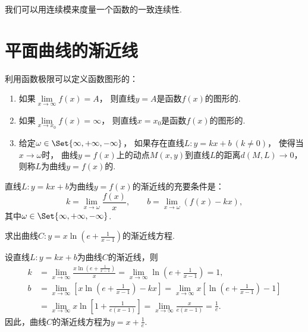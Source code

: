 我们可以用连续模来度量一个函数的一致连续性.

\section{平面曲线的渐近线}
\begin{definition}
利用函数极限可以定义函数图形的：
\begin{enumerate}
	\item 如果\(\lim\limits_{x \to \infty}f(x) = A\)，
	则直线\(y = A\)是函数\(f(x)\)的图形的.
	\item 如果\(\lim\limits_{x \to x_0}f(x) = \infty\)，
	则直线\(x = x_0\)是函数\(f(x)\)的图形的.
	\item 给定\(\omega\in\Set{\infty,+\infty,-\infty}\)，
	如果存在直线\(L: y = kx+b\ (k \neq 0)\)，
	使得当\(x\to\omega\)时，
	曲线\(y = f(x)\)上的动点\(M(x,y)\)到直线\(L\)的距离\(d(M,L)\to0\)，
	则称\(L\)为曲线\(y = f(x)\)的.
\end{enumerate}
\end{definition}

\begin{theorem}
直线\(L: y = kx+b\)为曲线\(y = f(x)\)的渐近线的充要条件是：\[
	k = \lim\limits_{x\to\omega} \frac{f(x)}{x},
	\qquad
	b = \lim\limits_{x\to\omega} (f(x) - kx),
\]
其中\(\omega\in\Set{\infty,+\infty,-\infty}\).
\end{theorem}

\begin{example}
求出曲线\(C: y = x \ln\left(e+\frac{1}{x-1}\right)\)的渐近线方程.
\begin{solution}
设直线\(L: y = kx+b\)为曲线\(C\)的渐近线，则\begin{align*}
	k &= \lim\limits_{x\to\infty} \frac{x \ln\left(e+\frac{1}{x-1}\right)}{x}
	= \lim\limits_{x\to\infty} \ln\left(e+\frac{1}{x-1}\right)
	= 1, \\
	b &= \lim\limits_{x\to\infty} \left[ x \ln\left(e+\frac{1}{x-1}\right) - kx \right]
	= \lim\limits_{x\to\infty} x \left[ \ln\left(e+\frac{1}{x-1}\right) - 1 \right] \\
	&= \lim\limits_{x\to\infty} x \ln\left[1+\frac{1}{e(x-1)}\right]
	= \lim\limits_{x\to\infty} \frac{x}{e(x-1)}
	= \frac{1}{e}.
\end{align*}
因此，曲线\(C\)的渐近线方程为\(y = x + \frac{1}{e}\).
\end{solution}
\end{example}


